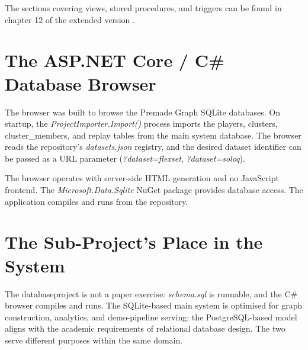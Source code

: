 The sections covering views, stored procedures, and triggers can be found in chapter 12 of the extended version \cite{premadegraph-full}.

\section{The ASP.NET Core / C\# Database Browser}

The browser was built to browse the Premade Graph SQLite databases. On startup, the \textit{ProjectImporter.Import()} process imports the players, clusters, cluster\_members, and replay tables from the main system database. The browser reads the repository's \textit{datasets.json} registry, and the desired dataset identifier can be passed as a URL parameter (\textit{?dataset=flexset}, \textit{?dataset=soloq}).

The browser operates with server-side HTML generation and no JavaScript frontend. The \textit{Microsoft.Data.Sqlite} NuGet package provides database access. The application compiles and runs from the repository.

\section{The Sub-Project's Place in the System}

The databaseproject is not a paper exercise: \textit{schema.sql} is runnable, and the C\# browser compiles and runs. The SQLite-based main system is optimised for graph construction, analytics, and demo-pipeline serving; the PostgreSQL-based model aligns with the academic requirements of relational database design. The two serve different purposes within the same domain.
